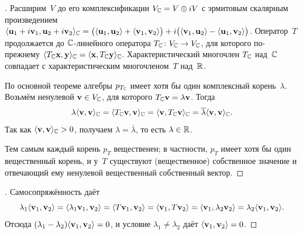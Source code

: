 \begin{proof}[]
Расширим~$V$ до его комплексификации $V_{\mathbb{C}} = V \oplus iV$ с
эрмитовым скалярным произведением
$\langle \mathbf{u}_1 + i\mathbf{v}_1, \mathbf{u}_2 + i\mathbf{v}_2 \rangle_{\mathbb{C}}
= \bigl(\langle \mathbf{u}_1, \mathbf{u}_2 \rangle + \langle \mathbf{v}_1, \mathbf{v}_2 \rangle\bigr)
+ i\bigl(\langle \mathbf{v}_1, \mathbf{u}_2 \rangle - \langle \mathbf{u}_1, \mathbf{v}_2 \rangle\bigr)$.
Оператор~$T$ продолжается до $\mathbb{C}$-линейного оператора
$T_{\mathbb{C}} \colon V_{\mathbb{C}} \to V_{\mathbb{C}}$, для которого по-прежнему
$\langle T_{\mathbb{C}}\mathbf{x}, \mathbf{y} \rangle_{\mathbb{C}} = \langle \mathbf{x}, T_{\mathbb{C}}\mathbf{y} \rangle_{\mathbb{C}}$.
Характеристический многочлен $T_{\mathbb{C}}$ над~$\mathbb{C}$ совпадает с
характеристическим многочленом~$T$ над~$\mathbb{R}$.

По основной теореме алгебры $p_{T_{\mathbb{C}}}$ имеет хотя бы один комплексный
корень~$\lambda$. Возьмём ненулевой $\mathbf{v} \in V_{\mathbb{C}}$, для которого
$T_{\mathbb{C}}\mathbf{v} = \lambda \mathbf{v}$. Тогда
\[
  \lambda \langle \mathbf{v}, \mathbf{v} \rangle_{\mathbb{C}}
  = \langle T_{\mathbb{C}}\mathbf{v}, \mathbf{v} \rangle_{\mathbb{C}}
  = \langle \mathbf{v}, T_{\mathbb{C}}\mathbf{v} \rangle_{\mathbb{C}}
  = \overline{\lambda} \langle \mathbf{v}, \mathbf{v} \rangle_{\mathbb{C}}.
\]
Так как $\langle \mathbf{v}, \mathbf{v} \rangle_{\mathbb{C}} > 0$, получаем
$\lambda = \overline{\lambda}$, то есть $\lambda \in \mathbb{R}$.

Тем самым каждый корень $p_T$ вещественен; в частности, $p_T$ имеет
хотя бы один вещественный корень, и у~$T$ существуют (вещественное)
собственное значение и отвечающий ему ненулевой вещественный
собственный вектор.
\end{proof}

\begin{proof}[]
Самосопряжённость даёт
\[
  \lambda_1 \langle \mathbf{v}_1, \mathbf{v}_2 \rangle
  = \langle \lambda_1 \mathbf{v}_1, \mathbf{v}_2 \rangle
  = \langle T\mathbf{v}_1, \mathbf{v}_2 \rangle
  = \langle \mathbf{v}_1, T\mathbf{v}_2 \rangle
  = \langle \mathbf{v}_1, \lambda_2 \mathbf{v}_2 \rangle
  = \lambda_2 \langle \mathbf{v}_1, \mathbf{v}_2 \rangle.
\]
Отсюда $(\lambda_1 - \lambda_2) \langle \mathbf{v}_1, \mathbf{v}_2 \rangle = 0$,
и условие $\lambda_1 \neq \lambda_2$ даёт
$\langle \mathbf{v}_1, \mathbf{v}_2 \rangle = 0$.
\end{proof}

